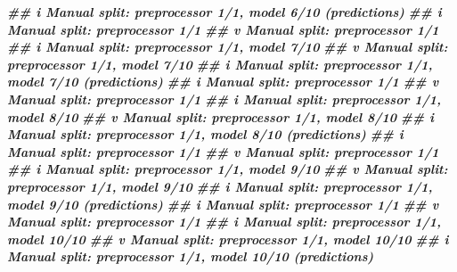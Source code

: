 \documentclass[
]{article}
\newenvironment{Shaded}{\begin{snugshade}}{\end{snugshade}}
\newcommand{\DocumentationTok}[1]{\textcolor[rgb]{0.56,0.35,0.01}{\textbf{\textit{#1}}}}
\begin{document}
\begin{Shaded}
\begin{Highlighting}[]
\DocumentationTok{\#\# i Manual split: preprocessor 1/1, model 6/10 (predictions)}
\DocumentationTok{\#\# i Manual split: preprocessor 1/1}
\DocumentationTok{\#\# v Manual split: preprocessor 1/1}
\DocumentationTok{\#\# i Manual split: preprocessor 1/1, model 7/10}
\DocumentationTok{\#\# v Manual split: preprocessor 1/1, model 7/10}
\DocumentationTok{\#\# i Manual split: preprocessor 1/1, model 7/10 (predictions)}
\DocumentationTok{\#\# i Manual split: preprocessor 1/1}
\DocumentationTok{\#\# v Manual split: preprocessor 1/1}
\DocumentationTok{\#\# i Manual split: preprocessor 1/1, model 8/10}
\DocumentationTok{\#\# v Manual split: preprocessor 1/1, model 8/10}
\DocumentationTok{\#\# i Manual split: preprocessor 1/1, model 8/10 (predictions)}
\DocumentationTok{\#\# i Manual split: preprocessor 1/1}
\DocumentationTok{\#\# v Manual split: preprocessor 1/1}
\DocumentationTok{\#\# i Manual split: preprocessor 1/1, model 9/10}
\DocumentationTok{\#\# v Manual split: preprocessor 1/1, model 9/10}
\DocumentationTok{\#\# i Manual split: preprocessor 1/1, model 9/10 (predictions)}
\DocumentationTok{\#\# i Manual split: preprocessor 1/1}
\DocumentationTok{\#\# v Manual split: preprocessor 1/1}
\DocumentationTok{\#\# i Manual split: preprocessor 1/1, model 10/10}
\DocumentationTok{\#\# v Manual split: preprocessor 1/1, model 10/10}
\DocumentationTok{\#\# i Manual split: preprocessor 1/1, model 10/10 (predictions)}


\end{Highlighting}
\end{Shaded}
\end{document}
